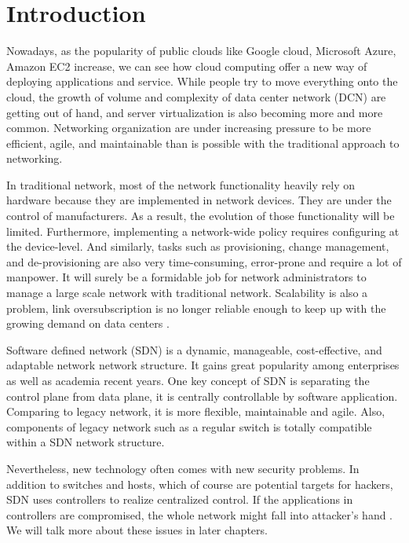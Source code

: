 \chapter{Introduction}
\label{chap:intro}
\setcounter{page}{1}

Nowadays, as the popularity of public clouds like Google cloud, Microsoft Azure, Amazon EC2 increase, we can see how cloud computing offer a new way of deploying applications and service. While people try to move everything onto the cloud, the growth of volume and complexity of data center network (DCN) are getting out of hand, and server virtualization is also becoming more and more common. Networking organization are under increasing pressure to be more efficient, agile, and maintainable than is possible with the traditional approach to networking.

In traditional network, most of the network functionality heavily rely on hardware because they are implemented in network devices. They are under the control of manufacturers. As a result, the evolution of those functionality will be limited. Furthermore, implementing a network-wide policy requires configuring at the device-level. And similarly, tasks such as provisioning, change management, and de-provisioning are also very time-consuming, error-prone and require a lot of manpower. It will surely be a formidable job for network administrators to manage a large scale network with traditional network. Scalability is also a problem, link oversubscription is no longer reliable enough to keep up with the growing demand on data centers \cite{TTN}.

Software defined network (SDN) is a dynamic, manageable, cost-effective, and adaptable network network structure. It gains great popularity among enterprises as well as academia recent years. One key concept of SDN is separating the control plane from data plane, it is centrally controllable by software application. Comparing to legacy network, it is more flexible, maintainable and agile. Also, components of legacy network such as a regular switch is totally compatible within a SDN network structure.

Nevertheless, new technology often comes with new security problems. In addition to switches and hosts, which of course are potential targets for hackers, SDN uses controllers to realize centralized control. If the applications in controllers are compromised, the whole network might fall into attacker's hand \cite{TSA}. We will talk more about these issues in later chapters.

